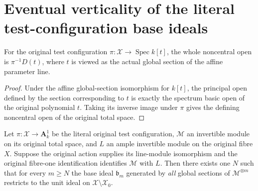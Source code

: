 \section{Eventual verticality of the literal test-configuration base ideals}

\begin{lemma}\label{lem:native-test-configuration-unit-open-principal}
\leanok
{}
For the original test configuration $\pi:\mathcal X\to\operatorname{Spec}k[t]$,
the whole noncentral open is $\pi^{-1}D(t)$, where $t$ is viewed as the
actual global section of the affine parameter line.
\end{lemma}
\begin{proof}
Under the affine global-section isomorphism for $k[t]$, the principal open
defined by the section corresponding to $t$ is exactly the spectrum basic
open of the original polynomial $t$. Taking its inverse image under $\pi$
gives the defining noncentral open of the original total space.
\end{proof}

\begin{theorem}\label{thm:native-test-configuration-eventual-verticality}
\leanok
{}
Let $\pi:\mathcal X\to\mathbf A^1_k$ be the literal original test
configuration, $\mathcal M$ an invertible module on its original total
space, and $L$ an ample invertible module on the original fibre $X$.
Suppose the original action supplies its line-module isomorphism and the
original fibre-one identification identifies $\mathcal M$ with $L$.
Then there exists one $N$ such that for every $m\ge N$ the base ideal
$\mathfrak b_m$ generated by \emph{all} global sections of
$\mathcal M^{\otimes m}$ restricts to the unit ideal on
$\mathcal X\setminus\mathcal X_0$.
\end{theorem}


